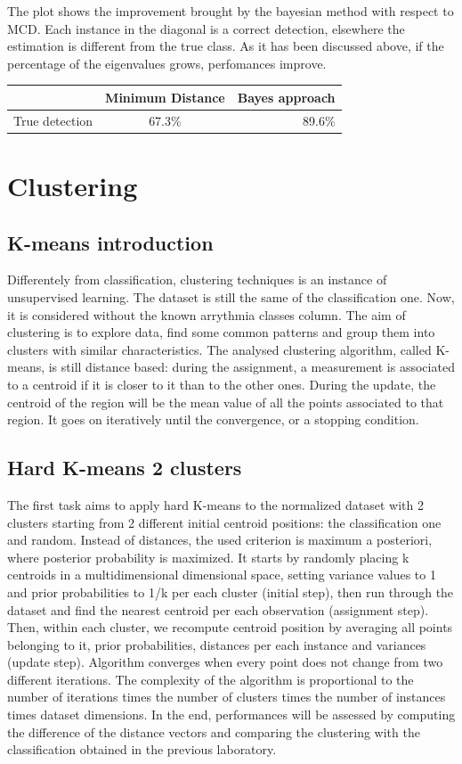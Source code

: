 \documentclass{article}
\begin{document}
The plot shows the improvement brought by the bayesian method with respect to MCD. Each instance in the diagonal is a correct detection, elsewhere the estimation is different from the true class. As it has been discussed above, if the percentage of the eigenvalues grows, perfomances improve.

\begin{center}
  \begin{tabular}{ | l | c | r | }
    \hline
     & Minimum Distance & Bayes approach \\ \hline
    True detection & 67.3\% & 89.6\% \\ 
    \hline
  \end{tabular}
\end{center}

\section{Clustering}
\subsection{K-means introduction}
Differentely from classification, clustering techniques is an instance of unsupervised learning. The dataset is still the same of the classification one. Now, it is considered without the known arrythmia classes column. The aim of clustering is to explore data, find some common patterns and group them into clusters with similar characteristics. The analysed clustering algorithm, called K-means, is still distance based: during the assignment, a measurement is associated to a centroid if it is closer to it than to the other ones. During the update, the centroid of the region will be the mean value of all the points associated to that region. It goes on iteratively until the convergence, or a stopping condition.

\subsection{Hard K-means 2 clusters}
The first task aims to apply hard K-means to the normalized dataset with 2 clusters starting from 2 different initial centroid positions: the classification one and random. Instead of distances, the used criterion is maximum a posteriori, where posterior probability is maximized. It starts by randomly placing k centroids in a multidimensional dimensional space, setting variance values to 1 and prior probabilities to 1/k per each cluster (initial step), then run through the dataset and find the nearest centroid per each observation (assignment step). Then, within each cluster, we recompute centroid position by averaging all points belonging to it, prior probabilities, distances per each instance and variances (update step). Algorithm converges when every point does not change from two different iterations. The complexity of the algorithm is proportional to the number of iterations times the number of clusters times the number of instances times dataset dimensions. 
In the end, performances will be assessed by computing the difference of the distance vectors and comparing the clustering with the classification obtained in the previous laboratory. 
\end{document}
